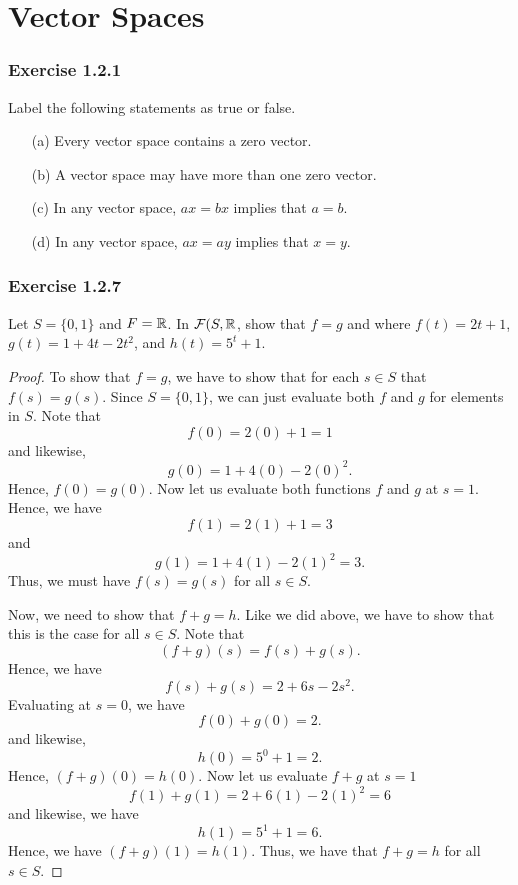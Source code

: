 \section{Vector Spaces}


\subsubsection{Exercise 1.2.1}

Label the following statements as true or false.

\begin{enumerate}
    \item[(a)] Every vector space contains a zero vector.
    \item[(b)] A vector space may have more than one zero vector.
    \item[(c)] In any vector space, \( ax = bx  \) implies that \( a = b  \).
    \item[(d)] In any vector space, \( ax = ay  \) implies that \( x = y \). 
\end{enumerate}

\subsubsection{Exercise 1.2.7} Let \( S  = \{ 0,1 \}   \) and \( F = \mathbb{R}   \). In \( \mathcal{F}(S,\mathbb{R} \), show that \( f = g  \) and where \( f(t) = 2t + 1  \), \( g(t) = 1 +4t - 2 t^{2}  \), and \( h(t) = 5^{t} + 1  \).
\begin{proof}
To show that \( f = g  \), we have to show that for each \( s \in S  \) that \( f(s) = g(s) \). Since \( S = \{ 0,1 \}  \), we can just evaluate both \( f  \) and \( g  \) for elements in \( S  \). Note that 
\[  f(0) = 2(0) + 1 = 1   \]
and likewise, 
\[  g(0) = 1 + 4(0) - 2(0)^{2}.\]
Hence, \( f(0) = g(0) \).  Now let us evaluate both functions \( f  \) and \( g  \) at \( s = 1  \). Hence, we have 
\[  f(1) = 2(1) + 1 = 3  \]
and
\[  g(1) = 1 + 4(1) - 2(1)^{2} = 3.  \]
Thus, we must have \( f(s) = g(s)  \) for all \( s \in S  \).

Now, we need to show that \( f + g = h  \). Like we did above, we have to show that this is the case for all \( s \in S  \). Note that 
\[  (f+g)(s) = f(s) + g(s). \]
Hence, we have 
\[  f(s) + g(s) = 2 + 6s  - 2s^{2}. \]
Evaluating at \( s = 0  \), we have 
\[  f(0) + g(0) = 2.\] and likewise,  
\[  h(0) = 5^{0} + 1 = 2. \] Hence, \(  (f+g)(0) = h(0) \).
Now let us evaluate \( f + g  \) at \( s = 1  \)  
\[ f(1) + g(1) = 2 + 6(1) - 2(1)^{2} = 6    \]
and likewise, we have 
\[  h(1) = 5^{1} + 1 = 6.\]
Hence, we have \( (f+g)(1) = h(1) \). Thus, we have that 
\( f+g = h \) for all \( s \in S \).

\end{proof}

